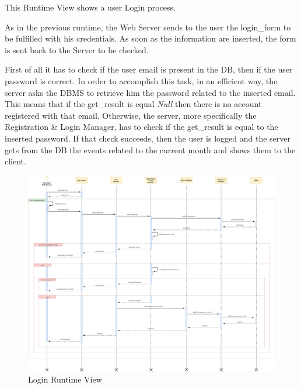 This Runtime View shows a user Login process.\par
As in the previous runtime, the Web Server sends to the user the login\_form to be fulfilled with his credentials. As soon as the information are inserted, the form is sent back to the Server to be checked.\par
First of all it has to check if the user email is present in the DB, then if the user password is correct. In order to accomplish this task, in an efficient way, the server asks the DBMS to retrieve him the password related to the inserted email. This means that if the get\_result is equal \emph{Null} then there is no account registered with that email. Otherwise, the server, more specifically the Registration \& Login Manager, has to check if the get\_result is equal to the inserted password.
If that check succeeds, then the user is logged and the server gets from the DB the events related to the current month and shows them to the client.
\begin{figure}[H]
	\centering
	\includegraphics[scale=0.17]{Images/Runtime/Login}
	\caption{Login Runtime View}
\end{figure}

